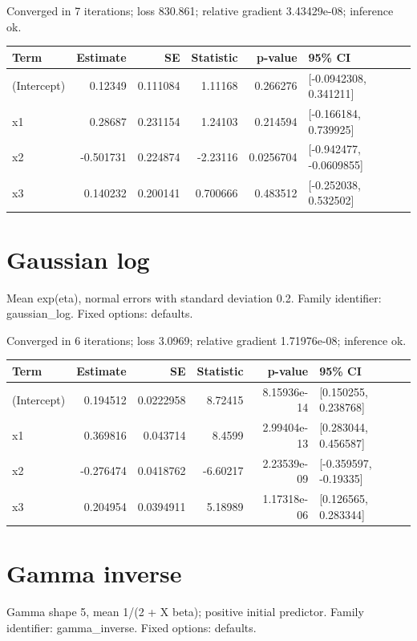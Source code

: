 \documentclass[11pt]{article}
\begin{document}
Converged in 7 iterations; loss 830.861; relative gradient 3.43429e-08; inference ok.
\begin{center}\small\begin{tabular}{lrrrrl}\toprule
Term & Estimate & SE & Statistic & p-value & 95\% CI \\ \midrule
(Intercept) & 0.12349 & 0.111084 & 1.11168 & 0.266276 & [-0.0942308, 0.341211] \\
x1 & 0.28687 & 0.231154 & 1.24103 & 0.214594 & [-0.166184, 0.739925] \\
x2 & -0.501731 & 0.224874 & -2.23116 & 0.0256704 & [-0.942477, -0.0609855] \\
x3 & 0.140232 & 0.200141 & 0.700666 & 0.483512 & [-0.252038, 0.532502] \\
\bottomrule\end{tabular}\end{center}
\section{Gaussian log}
Mean exp(eta), normal errors with standard deviation 0.2. Family identifier: gaussian\_log. Fixed options: defaults.

Converged in 6 iterations; loss 3.0969; relative gradient 1.71976e-08; inference ok.
\begin{center}\small\begin{tabular}{lrrrrl}\toprule
Term & Estimate & SE & Statistic & p-value & 95\% CI \\ \midrule
(Intercept) & 0.194512 & 0.0222958 & 8.72415 & 8.15936e-14 & [0.150255, 0.238768] \\
x1 & 0.369816 & 0.043714 & 8.4599 & 2.99404e-13 & [0.283044, 0.456587] \\
x2 & -0.276474 & 0.0418762 & -6.60217 & 2.23539e-09 & [-0.359597, -0.19335] \\
x3 & 0.204954 & 0.0394911 & 5.18989 & 1.17318e-06 & [0.126565, 0.283344] \\
\bottomrule\end{tabular}\end{center}
\section{Gamma inverse}
Gamma shape 5, mean 1/(2 + X beta); positive initial predictor. Family identifier: gamma\_inverse. Fixed options: defaults.
\end{document}
